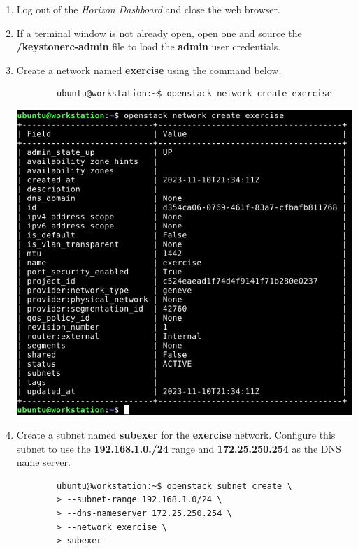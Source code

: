 \documentclass[letterpaper, 12pt]{article}
\begin{document}
\begin{enumerate}
    \item Log out of the \textit{Horizon Dashboard} and close the web browser.
    
    \item If a terminal window is not already open, open one and source the \textbf{\texttildemid/keystonerc-admin} file
    to load the \textbf{admin} user credentials.
    
    \item Create a network named \textbf{exercise} using the command below.
    \begin{lstlisting}
        ubuntu@workstation:~$ openstack network create exercise
    \end{lstlisting}

    \begin{center}
        \includegraphics[width=\linewidth]{images/part3/step8.png}
    \end{center}

    \item Create a subnet named \textbf{subexer} for the \textbf{exercise} network. Configure this subnet to use the
    \textbf{192.168.1.0./24} range and \textbf{172.25.250.254} as the DNS name server.
    \begin{lstlisting}
        ubuntu@workstation:~$ openstack subnet create \
        > --subnet-range 192.168.1.0/24 \
        > --dns-nameserver 172.25.250.254 \
        > --network exercise \
        > subexer
    \end{lstlisting}


\end{enumerate}
\end{document}
